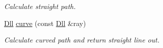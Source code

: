 \begin{DoxyCompactItemize}
\begin{DoxyCompactList}\small\item\em Calculate straight path. \end{DoxyCompactList}\item 
\hypertarget{structvsr_1_1_lenz_a708d1d659bd561cc02571b5e439c871c}{\hyperlink{namespacevsr_a6c6892b7aec25cfb16492501e2e35b11}{Dll} \hyperlink{structvsr_1_1_lenz_a708d1d659bd561cc02571b5e439c871c}{curve} (const \hyperlink{namespacevsr_a6c6892b7aec25cfb16492501e2e35b11}{Dll} \&ray)}\label{structvsr_1_1_lenz_a708d1d659bd561cc02571b5e439c871c}

\begin{DoxyCompactList}\small\item\em Calculate curved path and return straight line out. \end{DoxyCompactList}\end{DoxyCompactItemize}
